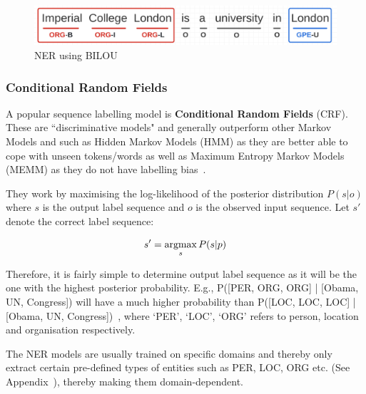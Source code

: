 \begin{figure}[H]
    \centering
    \includegraphics[scale=0.35]{images/bilou.png}
    \caption{NER using BILOU}
    \end{figure}

\subsubsection*{Conditional Random Fields}
A popular sequence labelling model is \textbf{Conditional Random Fields }(CRF). These are ``discriminative models" and generally outperform other Markov Models and such as Hidden Markov Models (HMM) as they are better able to cope with unseen tokens/words as well as Maximum Entropy Markov Models (MEMM) as they do not have labelling bias~\cite{crf}.

They work by maximising the log-likelihood of the posterior distribution $P(s|o)$ where $s$ is the output label sequence and $o$ is the observed input sequence. Let $s'$ denote the correct label sequence: 

\[ s' = \operatorname*{argmax}_{s} P (s|p) \]

Therefore, it is fairly simple to determine output label sequence as it will be the one with the highest posterior probability. E.g., P([PER, ORG, ORG] | [Obama, UN, Congress]) will have a much higher probability than  P([LOC, LOC, LOC] | [Obama, UN, Congress])~\cite{crf}, where `PER', `LOC', `ORG' refers to person, location and organisation respectively.

The NER models are usually trained on specific domains and thereby only extract certain pre-defined types of entities such as PER, LOC, ORG etc. (See Appendix~), thereby making them domain-dependent.




